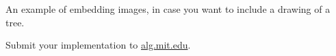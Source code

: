 \documentclass[12pt,twoside]{article}
\begin{document}


\begin{problems}

\problem  %

\begin{problemparts}
\problempart %
An example of embedding images, in case you want to include a drawing of a tree.
\begin{center}
\end{center}
\problempart %
\problempart %
\problempart %
\end{problemparts}

\newpage
\problem  %

\begin{problemparts}
\problempart %
\problempart %
\problempart %
\end{problemparts}

\newpage
\problem  %

\newpage
\problem  %

\newpage
\problem  %

\begin{problemparts}
\problempart %
\problempart %
\problempart Submit your implementation to {\small\url{alg.mit.edu}}.
\end{problemparts}

\end{problems}
\end{document}
